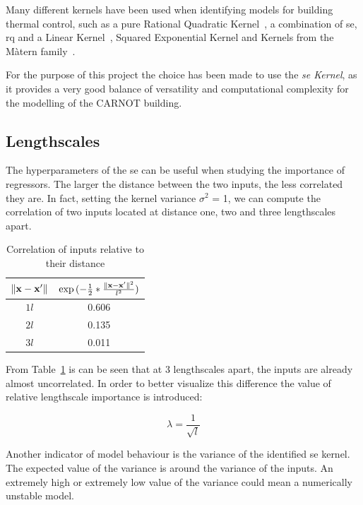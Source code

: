 Many different kernels have been used when identifying models for building
thermal control, such as a pure Rational Quadratic
Kernel~\cite{pleweSupervisoryModelPredictive2020}, a combination of
\acrshort{se}, \acrshort{rq} and a Linear
Kernel~\cite{jainLearningControlUsing2018}, Squared Exponential Kernel and
Kernels from the M\`atern family~\cite{massagrayThermalBuildingModelling2016}.

For the purpose of this project the choice has been made to use the
\textit{\acrlong{se} Kernel}, as it provides a very good balance of versatility
and computational complexity for the modelling of the CARNOT building.

\subsection{Lengthscales}\label{sec:lengthscales}

The hyperparameters of the \acrshort{se} can be useful when studying the
importance of regressors. The larger the distance between the two inputs, the
less correlated they are. In fact, setting the kernel variance $\sigma^2$ = 1,
we can compute the correlation of two inputs located at distance one, two and
three lengthscales apart. 

\begin{table}[ht]
\centering
    \begin{tabular}{||c c ||}
        \hline
        $\lVert\mathbf{x} - \mathbf{x}'\rVert$ &
        $\exp{(-\frac{1}{2}*\frac{\lVert\mathbf{x} - \mathbf{x}'\rVert^2}{l^2})}$ \\
        \hline \hline
        $1l$ & 0.606 \\
        $2l$ & 0.135 \\
        $3l$ & 0.011 \\
        \hline
    \end{tabular}
\caption{Correlation of inputs relative to their distance}
\label{tab:se_correlation}
\end{table}

From Table~\ref{tab:se_correlation} is can be seen that at 3 lengthscales apart,
the inputs are already almost uncorrelated. In order to better visualize this
difference the value of relative lengthscale importance is introduced:

\begin{equation}
    \lambda = \frac{1}{\sqrt{l}}
\end{equation}

Another indicator of model behaviour is the variance of the identified
\acrshort{se} kernel. The expected value of the variance is around the variance
of the inputs. An extremely high or extremely low value of the variance could
mean a numerically unstable model.

